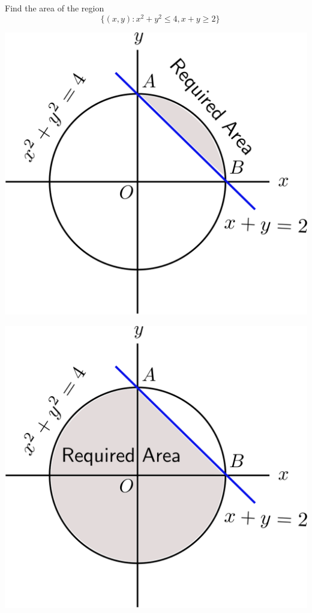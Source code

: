 \documentclass[14pt,fleqn]{extarticle}
\begin{document}
Find the area of the region 
%
\[ \quad \lbrace (x,y): x^2+y^2\leq 4, x + y\geq 2 \rbrace \]

\newcard

\begin{center}
\includegraphics[scale=0.35]{img_right.svg}
\end{center}

\newcard

\begin{center}
\includegraphics[scale=0.35]{img_wrong.svg}
\end{center}
\end{document}
